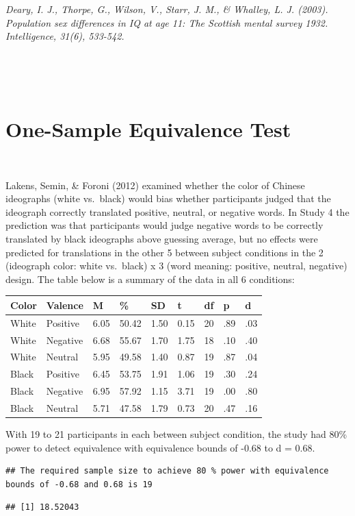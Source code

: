 \documentclass[english,man]{apa6}
\theoremstyle{definition}
\theoremstyle{definition}
\theoremstyle{definition}
\theoremstyle{remark}
\begin{document}
\emph{Deary, I. J., Thorpe, G., Wilson, V., Starr, J. M., \& Whalley, L.
J. (2003). Population sex differences in IQ at age 11: The Scottish
mental survey 1932. Intelligence, 31(6), 533-542.}

~

~

\section{One-Sample Equivalence Test}\label{one-sample-equivalence-test}

~

Lakens, Semin, \& Foroni (2012) examined whether the color of Chinese
ideographs (white vs.~black) would bias whether participants judged that
the ideograph correctly translated positive, neutral, or negative words.
In Study 4 the prediction was that participants would judge negative
words to be correctly translated by black ideographs above guessing
average, but no effects were predicted for translations in the other 5
between subject conditions in the 2 (ideograph color: white vs.~black) x
3 (word meaning: positive, neutral, negative) design. The table below is
a summary of the data in all 6 conditions:

\begin{longtable}[]{@{}lllllllll@{}}
\toprule
Color & Valence & M & \% & SD & t & df & p & d\tabularnewline
\midrule
\endhead
White & Positive & 6.05 & 50.42 & 1.50 & 0.15 & 20 & .89 &
.03\tabularnewline
White & Negative & 6.68 & 55.67 & 1.70 & 1.75 & 18 & .10 &
.40\tabularnewline
White & Neutral & 5.95 & 49.58 & 1.40 & 0.87 & 19 & .87 &
.04\tabularnewline
Black & Positive & 6.45 & 53.75 & 1.91 & 1.06 & 19 & .30 &
.24\tabularnewline
Black & Negative & 6.95 & 57.92 & 1.15 & 3.71 & 19 & .00 &
.80\tabularnewline
Black & Neutral & 5.71 & 47.58 & 1.79 & 0.73 & 20 & .47 &
.16\tabularnewline
\bottomrule
\end{longtable}

With 19 to 21 participants in each between subject condition, the study
had 80\% power to detect equivalence with equivalence bounds of -0.68 to
d = 0.68.

\begin{verbatim}
## The required sample size to achieve 80 % power with equivalence bounds of -0.68 and 0.68 is 19
\end{verbatim}

\begin{verbatim}
## [1] 18.52043
\end{verbatim}
\end{document}
